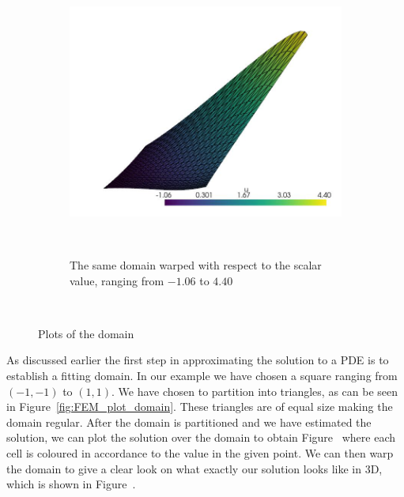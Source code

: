 \begin{figure}[H]
\begin{subfigure}{.49\textwidth}
    \end{subfigure}
    \begin{subfigure}{.49\textwidth}
        \centering
        \includegraphics[width=\textwidth]{Afsnit/Application/figurer/screenshot_3.jpeg}
        \caption{The same domain warped with respect to the scalar value, ranging from $-1.06$ to $4.40$}~\label{fig:FEM_plot_3D}
    \end{subfigure}
    \caption{Plots of the domain}~\label{fig:FEM_plots}
\end{figure}

As discussed earlier the first step in approximating the solution to a PDE is to establish a fitting domain. In our example we have chosen a square ranging from $(-1,-1)$ to $(1,1)$.
We have chosen to partition into triangles, as can be seen
in Figure~\ref{fig:FEM_plot_domain}. 
These triangles are of equal size making the domain regular.
After the domain is partitioned and we have estimated the solution,
we can plot the solution over the domain to obtain Figure~ 
where each cell is coloured in accordance to the value in the given point.
We can then warp the domain to give a clear look on what exactly our solution looks like in 3D, 
which is shown in Figure~.
